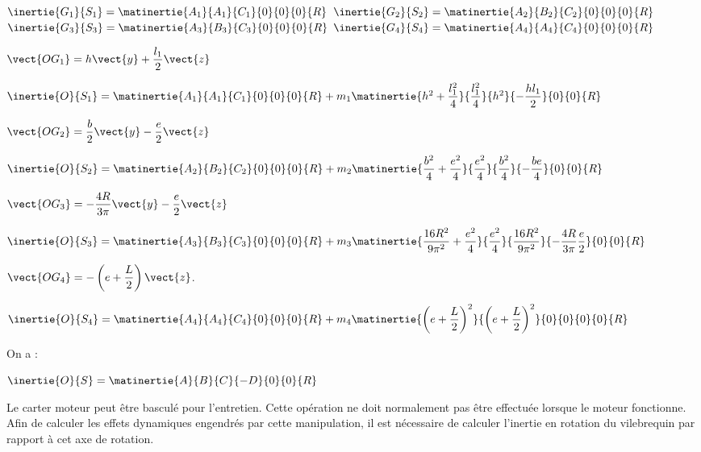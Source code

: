 \ifprof \begin{corrige} ~\\

$\inertie{G_1}{S_1}=\matinertie{A_1}{A_1}{C_1}{0}{0}{0}{R}$
$\inertie{G_2}{S_2}=\matinertie{A_2}{B_2}{C_2}{0}{0}{0}{R}$
$\inertie{G_3}{S_3}=\matinertie{A_3}{B_3}{C_3}{0}{0}{0}{R}$
$\inertie{G_4}{S_4}=\matinertie{A_4}{A_4}{C_4}{0}{0}{0}{R}$
\end{corrige}\else\fi



\ifprof \begin{corrige}

$\vect{OG_1} = h\vect{y}+\dfrac{l_1}{2}\vect{z}$

$\inertie{O}{S_1}=\matinertie{A_1}{A_1}{C_1}{0}{0}{0}{R}
+m_1\matinertie{h^2+\dfrac{l_1^2}{4}}{\dfrac{l_1^2}{4}}{h^2}{-\dfrac{hl_1}{2}}{0}{0}{R}$

$\vect{OG_2} = \dfrac{b}{2}\vect{y}-\dfrac{e}{2}\vect{z}$

$\inertie{O}{S_2}=\matinertie{A_2}{B_2}{C_2}{0}{0}{0}{R}
+m_2\matinertie{\dfrac{b^2}{4}+\dfrac{e^2}{4}}{\dfrac{e^2}{4}}{\dfrac{b^2}{4}}{-\dfrac{be}{4}}{0}{0}{R}$

$\vect{OG_3} = -\dfrac{4R}{3\pi}  \vect{y}-\dfrac{e}{2}\vect{z}$

$\inertie{O}{S_3}=\matinertie{A_3}{B_3}{C_3}{0}{0}{0}{R}
+m_3\matinertie{\dfrac{16R^2}{9\pi^2}+\dfrac{e^2}{4}}{\dfrac{e^2}{4}}{\dfrac{16R^2}{9\pi^2}}{-\dfrac{4R}{3\pi}\dfrac{e}{2}}{0}{0}{R}$

$\vect{OG_4} = -\left(e+\dfrac{L}{2}\right)\vect{z}$.

$\inertie{O}{S_4}=\matinertie{A_4}{A_4}{C_4}{0}{0}{0}{R}
+m_4\matinertie{\left(e+\dfrac{L}{2}\right)^2}{\left(e+\dfrac{L}{2}\right)^2}{0}{0}{0}{0}{R}$

On a : 

$\inertie{O}{S}=\matinertie{A}{B}{C}{-D}{0}{0}{R}$
\end{corrige}
\else\fi

Le carter moteur peut être basculé pour l’entretien. Cette opération ne doit normalement pas être effectuée lorsque le moteur fonctionne. Afin de calculer les effets dynamiques engendrés par cette manipulation, il est nécessaire de calculer l’inertie en rotation du vilebrequin par rapport à cet axe de rotation.

